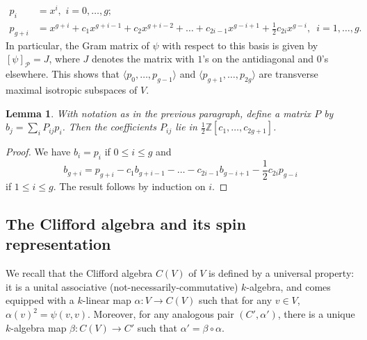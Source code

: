 \documentclass{article} %
\newtheorem{lemma}[proposition]{Lemma}
\numberwithin{equation}{section}
\newcommand{\Z}{\mathbb{Z}}
\begin{document}
\begin{align}\label{eq_straightened_basis}
 p_i &= x^i, \,\, i = 0, \dots, g; \\
p_{g+i} &= x^{g+i} + c_1 x^{g+i-1} + c_2 x^{g+i-2} + \dots + c_{2i-1} x^{g-i+1} + \frac{1}{2} c_{2i} x^{g-i},\,\,\,i = 1, \dots, g. 
\end{align}
In particular, the Gram matrix of $\psi$ with respect to this basis is given by $[\psi]_\mathcal{P} = J$, where $J$ denotes the matrix with $1$'s on the antidiagonal and $0$'s elsewhere. This shows that $\langle p_0, \dots, p_{g-1} \rangle$ and $\langle p_{g+1}, \dots, p_{2g} \rangle$ are transverse maximal isotropic subspaces of $V$.
\begin{lemma}\label{lem_change_of_basis_matrix_is_integral}
    With notation as in the previous paragraph, define a matrix $P$ by $b_j = \sum_i P_{ij} p_i$. Then the coefficients $P_{ij}$ lie in $\frac{1}{2} \Z[c_1, \dots,  c_{2g+1}]$.
\end{lemma}
\begin{proof}
    We have $b_i = p_i$ if $0 \leq i \leq g$ and \[ b_{g+i} = p_{g+i} - c_1 b_{g+i-1} - \dots - c_{2i-1} b_{g-i+1} - \frac{1}{2} c_{2i} p_{g-i} \]
    if $1 \leq i \leq g$. The result follows by induction on $i$. 
\end{proof}

\subsection{The Clifford algebra and its spin representation}\label{subsec_Clifford_algebra}

We recall that the Clifford algebra $C(V)$ of $V$ is defined by a universal property: it is a unital associative (not-necessarily-commutative) $k$-algebra, and comes equipped with a $k$-linear map $\alpha : V \to C(V)$ such that for any $v \in V$, $\alpha(v)^2 = \psi(v, v)$. Moreover, for any analogous pair $(C', \alpha')$, there is a unique $k$-algebra map $\beta : C(V) \to C'$ such that $\alpha' = \beta \circ \alpha$.
\end{document}
